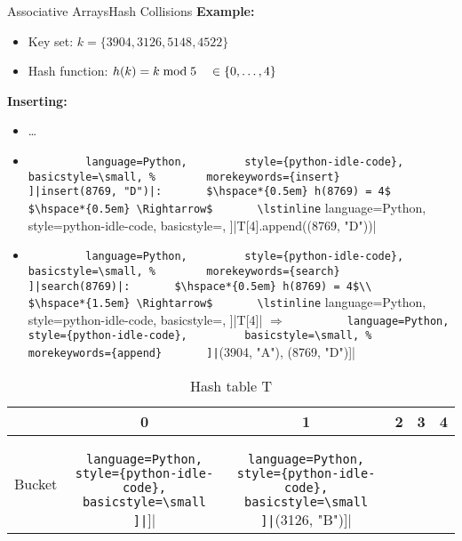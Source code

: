 \begin{frame}{Associative Arrays}{Hash Collisions}
  \textbf{Example:}
  \begin{itemize}
    \item
    Key set: $k = \{3904, 3126, 5148, 4522\}$
    \item
    Hash function:
    $h(k) = k \;\mathrm{mod}\; 5 \hspace*{1.0em} \in \{0, \ldots, 4\}$
  \end{itemize}
  \textbf{Inserting:}
  \begin{itemize}
    \item
      \dots
    \item
      \lstinline[
        language=Python,
        style={python-idle-code},
        basicstyle=\small,
      ]|insert(8769, "D")|:
      $\hspace*{0.5em} h(8769) = 4$
      $\hspace*{0.5em} \Rightarrow$
      \lstinline[
        language=Python,
        style={python-idle-code},
        basicstyle=\small,
      ]|T[4].append((8769, "D"))|
    \item
      \lstinline[
        language=Python,
        style={python-idle-code},
        basicstyle=\small,
      ]|search(8769)|:
      $\hspace*{0.5em} h(8769) = 4$\\
      $\hspace*{1.5em} \Rightarrow$
      \lstinline[
        language=Python,
        style={python-idle-code},
        basicstyle=\small,
      ]|T[4]|
      $\Rightarrow$
      \lstinline[
        language=Python,
        style={python-idle-code},
        basicstyle=\small,
      ]|[(3904, "A"), (8769, "D")]|
  \end{itemize}
  \vspace*{-1.0em}
  \begin{table}[!b]
    \caption{Hash table T}
    \label{tab:hash_table_example_linked}
    \begin{tabularx}{\textwidth}{l|ccccc}
      {} & 0 & 1 & 2 & 3 & 4\\
      \midrule
      Bucket &
      \lstinline[
        language=Python,
        style={python-idle-code},
        basicstyle=\small
      ]|[]| &
      \lstinline[
        language=Python,
        style={python-idle-code},
        basicstyle=\small
      ]|[(3126, "B")]| &
      \lstinline[

\end{tabularx}
\end{table}
\end{frame}
